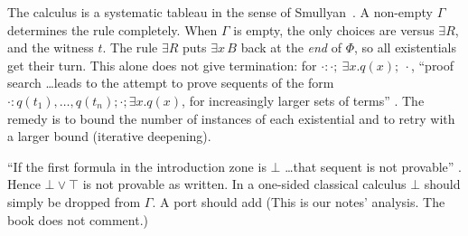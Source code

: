 \begin{fullwidth}
\end{fullwidth}

\noindent The calculus is a systematic tableau in the sense of Smullyan~\cite{Smullyan1968}. A non-empty
$\Gamma$ determines the rule completely. When $\Gamma$ is empty, the only choices are  versus
$\exists R$, and the witness $t$. The rule $\exists R$ puts $\exists x\,B$ back at the \emph{end} of $\Phi$,
so all existentials get their turn. This alone does not give termination: for
$\cdot:\cdot;\ \exists x.q(x);\ \cdot$, ``proof search \ldots leads to the attempt to prove sequents
of the form $\cdot : q(t_1),\ldots,q(t_n);\cdot;\exists x.q(x)$, for increasingly larger sets of terms''
. The remedy is to bound the number of instances of each existential and to retry with a larger
bound (iterative deepening).

\begin{pitfall}
``If the first formula in the introduction zone is $\bot$ \ldots that sequent is not provable''
. Hence $\bot\lor\top$ is not provable as written. In a one-sided classical calculus $\bot$ should
simply be dropped from $\Gamma$. A port should add  (This is our
notes' analysis. The book does not comment.)
\end{pitfall}

